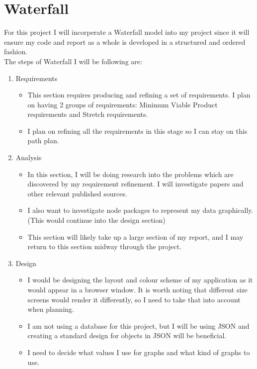 \documentclass{report}
\begin{document}
\section{Waterfall}
    For this project I will incorperate a Waterfall model into my project since it will ensure my code and report as a whole is developed in a structured and ordered fashion.\\
    The steps of Waterfall I will be following are:
    \begin{enumerate}
        \item Requirements 
        \begin{itemize}
            \item This section requires producing and refining a set of requirements. I plan on having 2 groups of requirements: Minimum Viable Product requirements and Stretch requirements.
            \item I plan on refining all the requirements in this stage so I can stay on this path plan.
        \end{itemize}
        \item Analysis
        \begin{itemize}
            \item In this section, I will be doing research into the problems which are discovered by my requirement refinement. I will investigate papers and other relevant published sources.
            \item I also want to investigate node packages to represent my data graphically. (This would continue into the design section)
            \item This section will likely take up a large section of my report, and I may return to this section midway through the project.
        \end{itemize}
        \item Design
        \begin{itemize}
            \item I would be designing the layout and colour scheme of my application as it would appear in a browser window. It is worth noting that different size screens would render it differently, so I need to take that into account when planning.
            \item I am not using a database for this project, but I will be using JSON and creating a standard design for objects in JSON will be beneficial.
            \item I need to decide what values I use for graphs and what kind of graphs to use.

\end{itemize}
\end{enumerate}
\end{document}
